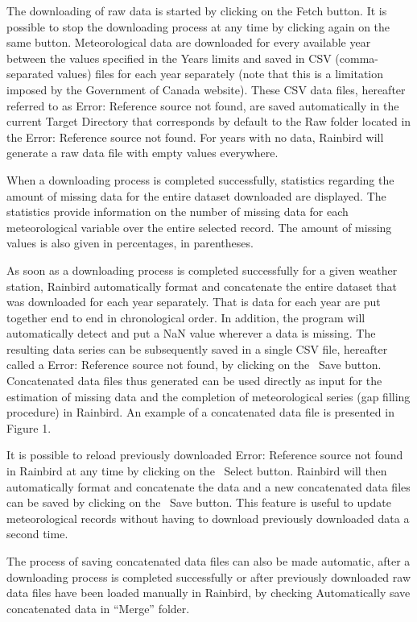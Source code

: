 \documentclass[12pt, letterpaper, fleqn]{report}
\begin{document}
The downloading of raw data is started by clicking on the  Fetch button. It is possible to stop the downloading process at any time by clicking again on the same button. Meteorological data are downloaded for every available year between the values specified in the Years limits and saved in CSV (comma-separated values) files for each year separately (note that this is a limitation imposed by the Government of Canada website). These CSV data files, hereafter referred to as Error: Reference source not found, are saved automatically in the current Target Directory that corresponds by default to the Raw folder located in the Error: Reference source not found. For years with no data, Rainbird will generate a raw data file with empty values everywhere.

When a downloading process is completed successfully, statistics regarding the amount of missing data for the entire dataset downloaded are displayed. The statistics provide information on the number of missing data for each meteorological variable over the entire selected record. The amount of missing values is also given in percentages, in parentheses.

As soon as a downloading process is completed successfully for a given weather station, Rainbird automatically format and concatenate the entire dataset that was downloaded for each year separately. That is data for each year are put together end to end in chronological order. In addition, the program will automatically detect and put a NaN value wherever a data is missing. The resulting data series can be subsequently saved in a single CSV file, hereafter called a Error: Reference source not found, by clicking on the   Save button. Concatenated data files thus generated can be used directly as input for the estimation of missing data and the completion of meteorological series (gap filling procedure) in Rainbird. An example of a concatenated data file is presented in Figure 1.

It is possible to reload previously downloaded Error: Reference source not found in Rainbird at any time by clicking on the  Select button. Rainbird will then automatically format and concatenate the data and a new concatenated data files can be saved by clicking on the  Save button. This feature is useful to update meteorological records without having to download previously downloaded data a second time.

The process of saving concatenated data files can also be made automatic, after a downloading process is completed successfully or after previously downloaded raw data files have been loaded manually in Rainbird, by checking Automatically save concatenated data in “Merge” folder.
\end{document}
